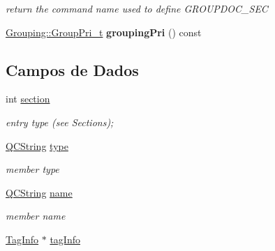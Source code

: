 \begin{DoxyCompactItemize}
\begin{DoxyCompactList}\small\item\em return the command name used to define G\-R\-O\-U\-P\-D\-O\-C\-\_\-\-S\-E\-C \end{DoxyCompactList}\item 
\hypertarget{class_entry_a5db3115a83b3912e36706a4270871229}{\hyperlink{struct_grouping_ae0be00a2b5dfbbc6c4558e88dddc9d81}{Grouping\-::\-Group\-Pri\-\_\-t} {\bfseries grouping\-Pri} () const }\label{class_entry_a5db3115a83b3912e36706a4270871229}

\end{DoxyCompactItemize}
\subsection*{Campos de Dados}
\begin{DoxyCompactItemize}
\item 
\hypertarget{class_entry_ab217561ce555727ff977aa053656a686}{int \hyperlink{class_entry_ab217561ce555727ff977aa053656a686}{section}}\label{class_entry_ab217561ce555727ff977aa053656a686}

\begin{DoxyCompactList}\small\item\em entry type (see Sections); \end{DoxyCompactList}\item 
\hypertarget{class_entry_a0d4463771e24026060ae68b04822d7af}{\hyperlink{class_q_c_string}{Q\-C\-String} \hyperlink{class_entry_a0d4463771e24026060ae68b04822d7af}{type}}\label{class_entry_a0d4463771e24026060ae68b04822d7af}

\begin{DoxyCompactList}\small\item\em member type \end{DoxyCompactList}\item 
\hypertarget{class_entry_adc0097c7bd1e61ad32058fcde425bc7a}{\hyperlink{class_q_c_string}{Q\-C\-String} \hyperlink{class_entry_adc0097c7bd1e61ad32058fcde425bc7a}{name}}\label{class_entry_adc0097c7bd1e61ad32058fcde425bc7a}

\begin{DoxyCompactList}\small\item\em member name \end{DoxyCompactList}\item 
\hypertarget{class_entry_abb1162dded11db5cb67c8ce3d52ec4e4}{\hyperlink{struct_tag_info}{Tag\-Info} $\ast$ \hyperlink{class_entry_abb1162dded11db5cb67c8ce3d52ec4e4}{tag\-Info}}\label{class_entry_abb1162dded11db5cb67c8ce3d52ec4e4}


\end{DoxyCompactItemize}
